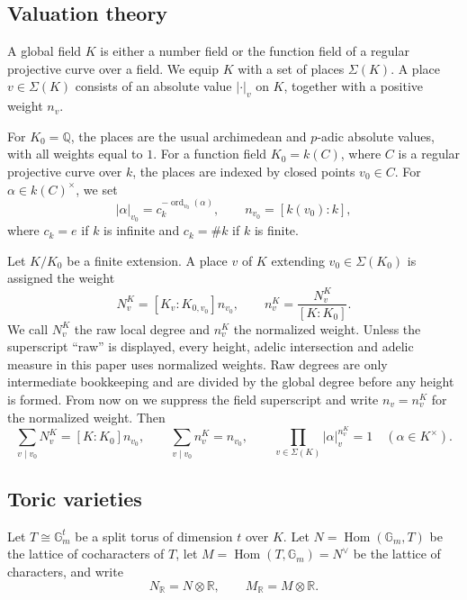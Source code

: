 \documentclass[10pt,a4paper]{amsart}
\theoremstyle{plain}
\theoremstyle{plain}
\numberwithin{equation}{section}
\begin{document}
\subsection{Valuation theory}
A global field \(K\) is either a number field or the function field of a
regular projective curve over a field.  We equip \(K\) with a set of places
\(\Sigma(K)\).  A place \(v\in\Sigma(K)\) consists of an absolute value
\(|\cdot|_v\) on \(K\), together with a positive weight \(n_v\).

For \(K_0=\mathbb Q\), the places are the usual archimedean and \(p\)-adic
absolute values, with all weights equal to \(1\).  For a function field
\(K_0=k(C)\), where \(C\) is a regular projective curve over \(k\), the places
are indexed by closed points \(v_0\in C\).  For
\(\alpha\in k(C)^\times\), we set
\[
|\alpha|_{v_0}=c_k^{-\operatorname{ord}_{v_0}(\alpha)},
\qquad
n_{v_0}=[k(v_0):k],
\]
where \(c_k=e\) if \(k\) is infinite and \(c_k=\#k\) if \(k\) is finite.

Let \(K/K_0\) be a finite extension.  A place \(v\) of \(K\) extending
\(v_0\in\Sigma(K_0)\) is assigned the weight
\[
N^{K}_{v}=[K_v:K_{0,v_0}]n_{v_0},
\qquad
n^{K}_{v}=\frac{N^{K}_{v}}{[K:K_0]}.
\]
We call \(N^{K}_{v}\) the raw local degree and \(n^{K}_{v}\) the normalized
weight.  Unless the superscript ``raw'' is displayed, every height, adelic
intersection and adelic measure in this paper uses normalized weights.  Raw
degrees are only intermediate bookkeeping and are divided by the global
degree before any height is formed.  From now on we suppress the field
superscript and write \(n_v=n_v^K\) for the normalized weight.
Then
\[
\sum_{v\mid v_0}N^{K}_{v}=[K:K_0]n_{v_0},
\qquad
\sum_{v\mid v_0}n^{K}_{v}=n_{v_0},
\qquad
\prod_{v\in\Sigma(K)}|\alpha|_v^{n^{K}_{v}}=1
\quad(\alpha\in K^\times).
\]
\subsection{Toric varieties}
Let \(T\cong\mathbb G_m^t\) be a split torus of dimension \(t\) over \(K\).
Let \(N=\operatorname{Hom}(\mathbb G_m,T)\) be the lattice of cocharacters of
\(T\), let \(M=\operatorname{Hom}(T,\mathbb G_m)=N^\vee\) be the lattice of
characters, and write
\[
N_{\mathbb R}=N\otimes\mathbb R,\qquad
M_{\mathbb R}=M\otimes\mathbb R .
\]
\end{document}
